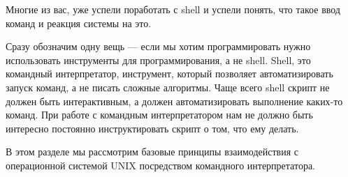 Многие из вас, уже успели поработать с shell и успели понять, что такое ввод команд и реакция системы на это. 

Сразу обозначим одну вещь --- если мы хотим программировать нужно использовать инструменты для программирования, а не shell. Shell, это командный интерпретатор, инструмент, который позволяет автоматизировать запуск команд, а не писать сложные алгоритмы. Чаще всего shell скрипт не должен быть интерактивным, а должен автоматизировать выполнение каких-то команд. При работе с командным интерпретатором нам не должно быть интересно постоянно инструктировать скрипт о том, что ему делать. 

В этом разделе мы рассмотрим базовые принципы взаимодействия с операционной системой UNIX посредством командного интерпретатора.